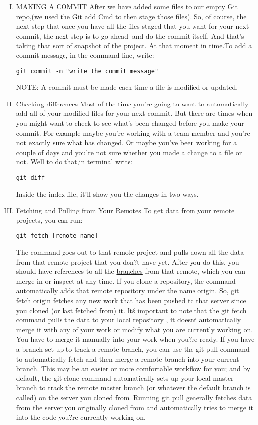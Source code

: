\documentclass[11pt,utf8]{article}
\begin{document}
\begin{enumerate}[I.]
\item MAKING A COMMIT
After we have added some files to our empty Git repo,(we used the Git add Cmd to then stage those files). So, of course, the next step that once you have all the files staged that you want for your next commit, the next step is to go ahead, and do the commit itself. And that's taking that sort of snapshot of the project. At that moment in time.To add a commit message, in the command line, write:
\begin{lstlisting}
git commit -m "write the commit message"
\end{lstlisting}
NOTE: A commit must be made each time a file is modified or updated.

\item Checking differences
Most of the time you're going to want to automatically add all of your modified files for your next commit. But there are times when you might want to check to see what's been changed before you make your commit. For example maybe you're working with a team member and you're not exactly sure what has changed. Or maybe you've been working for a couple of days and you're not sure whether you made a change to a file or not. Well to do that,in terminal write:
\begin{lstlisting}
git diff
\end{lstlisting}
Inside the index file, it'll show you the changes in two ways.

\item Fetching and Pulling from Your Remotes
To get data from your remote projects, you can run:
\begin{lstlisting}
git fetch [remote-name]
\end{lstlisting}
The command goes out to that remote project and pulls down all the data from that remote project that you don?t have yet. After you do this, you should have references to all the \href{https://github.com/Kunena/Kunena-Forum/wiki/Create-a-new-branch-with-git-and-manage-branches}{branches} from that remote, which you can merge in or inspect at any time.
If you clone a repository, the command automatically adds that remote repository under the name origin. So, git fetch origin fetches any new work that has been pushed to that server since you cloned (or last fetched from) it. It\'s important to note that the git fetch command pulls the data to your local repository , it doesn\'t automatically merge it with any of your work or modify what you are currently working on. You have to merge it manually into your work when you?re ready.
If you have a branch set up to track a remote branch, you can use the
git pull
command to automatically fetch and then merge a remote branch into your current branch. This may be an easier or more comfortable workflow for you; and by default, the git clone command automatically sets up your local master branch to track the remote master branch (or whatever the default branch is called) on the server you cloned from. Running git pull generally fetches data from the server you originally cloned from and automatically tries to merge it into the code you?re currently working on.


\end{enumerate}
\end{document}
